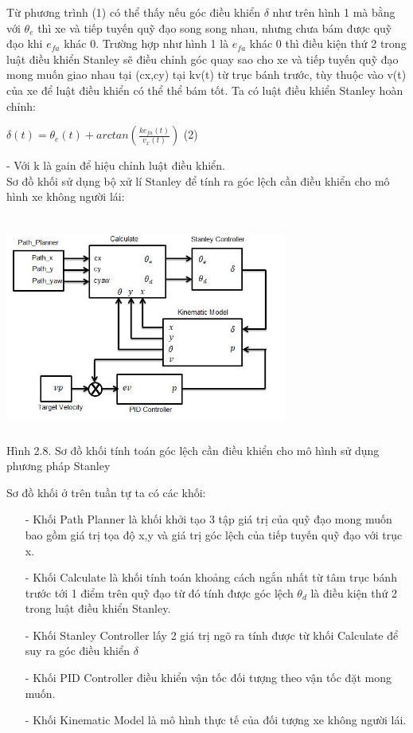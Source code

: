 \documentclass[a4paper, 12pt]{article}
\begin{document}
	\hspace{0.5cm}
	Từ phương trình (1) có thể thấy nếu góc điều khiển $\delta$ như trên hình 1 mà bằng với $\theta_{e}$ thì xe và tiếp tuyến quỹ đạo song song nhau, nhưng chưa bám được quỹ đạo khi $e_{fa}$ khác 0. Trường hợp như hình 1 là $e_{fa}$ khác 0 thì điều kiện thứ 2 trong luật điều khiển Stanley sẽ điều chỉnh góc quay sao cho xe và tiếp tuyến quỹ đạo mong muốn giao nhau tại (cx,cy) tại kv(t) từ trục bánh trước, tùy thuộc vào v(t) của xe để luật điều khiển có thể thể bám tốt. Ta có luật điều khiển Stanley hoàn chỉnh:\\
	\begin{center}
		$\delta(t) = \theta_{e}(t) + arctan(\frac{ke_{fa}(t)}{v_{x}(t)})$ (2)
	\end{center}
	- Với k là gain để hiệu chỉnh luật điều khiển.\\
	\indent
	Sơ đồ khối sử dụng bộ xử lí Stanley để tính ra góc lệch cần điều khiển cho mô hình xe không người lái:
	\begin{center}
		\includegraphics[width=350px,height=280px]{images/SoDoKhoiStanley}\\
		Hình 2.8. Sơ đồ khối tính toán góc lệch cần điều khiển cho mô hình sử dụng phương pháp Stanley
	\end{center}
	\hspace{0.5cm}
	Sơ đồ khối ở trên tuần tự ta có các khối:\\
	\begin{enumerate}
		\item[-] Khối Path Planner là khối khởi tạo 3 tập giá trị của quỹ đạo mong muốn bao gồm giá trị tọa độ x,y và giá trị góc lệch của tiếp tuyến quỹ đạo với trục x. 
		\item[-] Khối Calculate là khối tính toán khoảng cách ngắn nhất từ tâm trục bánh trước tới 1 điểm trên quỹ đạo từ đó tính được góc lệch $\theta_{d}$  là điều kiện thứ 2 trong luật điều khiển Stanley.
		\item[-] Khối Stanley Controller lấy 2 giá trị ngõ ra tính được từ khối Calculate để suy ra góc điều khiển $\delta$
		\item[-] Khối PID Controller điều khiển vận tốc đối tượng theo vận tốc đặt mong muốn.
		\item[-] Khối Kinematic Model là mô hình thực tế của đối tượng xe không người lái.
	\end{enumerate}
\end{document}
